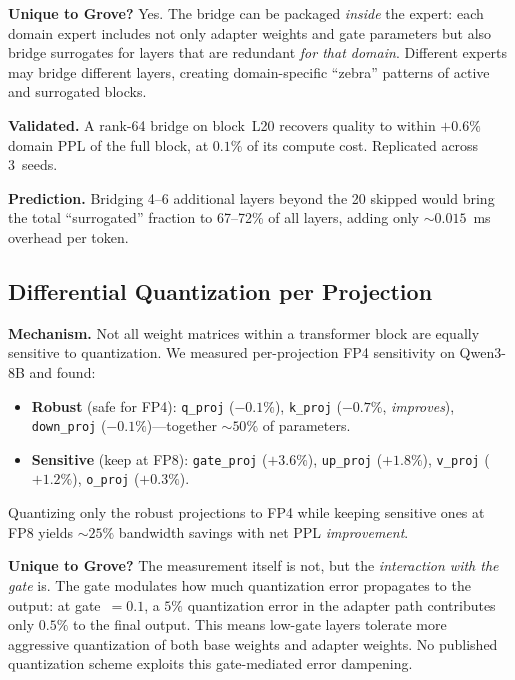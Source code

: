 \documentclass{article}
\begin{document}
\textbf{Unique to Grove?} Yes. The bridge can be packaged \emph{inside}
the expert: each domain expert includes not only adapter weights and
gate parameters but also bridge surrogates for layers that are redundant
\emph{for that domain}. Different experts may bridge different layers,
creating domain-specific ``zebra'' patterns of active and surrogated
blocks.

\textbf{Validated.} A rank-64 bridge on block~L20 recovers quality to
within $+0.6\%$ domain PPL of the full block, at $0.1\%$ of its compute
cost. Replicated across 3~seeds.

\textbf{Prediction.} Bridging 4--6 additional layers beyond the 20
skipped would bring the total ``surrogated'' fraction to 67--72\% of all
layers, adding only ${\sim}0.015$~ms overhead per token.

\subsection{Differential Quantization per Projection}
\label{sec:perf-diffquant}

\textbf{Mechanism.} Not all weight matrices within a transformer block
are equally sensitive to quantization. We measured per-projection FP4
sensitivity on Qwen3-8B and found:

\begin{itemize}[nosep]
\item \textbf{Robust} (safe for FP4): \texttt{q\_proj} ($-0.1\%$),
      \texttt{k\_proj} ($-0.7\%$, \emph{improves}),
      \texttt{down\_proj} ($-0.1\%$)---together ${\sim}50\%$ of
      parameters.
\item \textbf{Sensitive} (keep at FP8): \texttt{gate\_proj} ($+3.6\%$),
      \texttt{up\_proj} ($+1.8\%$), \texttt{v\_proj} ($+1.2\%$),
      \texttt{o\_proj} ($+0.3\%$).
\end{itemize}

Quantizing only the robust projections to FP4 while keeping sensitive
ones at FP8 yields ${\sim}25\%$ bandwidth savings with net PPL
\emph{improvement}.

\textbf{Unique to Grove?} The measurement itself is not, but the
\emph{interaction with the gate} is. The gate modulates how much
quantization error propagates to the output: at gate~$= 0.1$, a $5\%$
quantization error in the adapter path contributes only $0.5\%$ to the
final output. This means low-gate layers tolerate more aggressive
quantization of both base weights and adapter weights. No published
quantization scheme exploits this gate-mediated error dampening.
\end{document}
